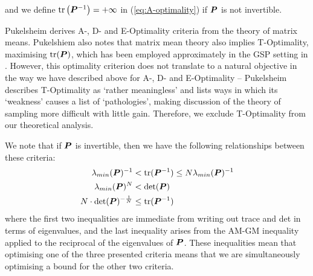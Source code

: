 \noindent and we define $\textrm{tr}\left(\bm{P}^{-1}\right) = +\infty$ in (\ref{eq:A-optimality}) if $\bm{P}$ is not invertible.

Pukelsheim derives A-, D- and E-Optimality criteria from the theory of matrix means. Pukelshiem also notes that matrix mean theory also implies T-Optimality, maximising $\text{tr}(\bm{P})$, which has been employed approximately in the GSP setting in \cite{puy2018random}. However, this optimality criterion does not translate to a natural objective in the way we have described above for A-, D- and E-Optimality -- Pukelsheim describes T-Optimality as `rather meaningless'\cite[Section 6.5]{pukelsheim2006optimal} and lists ways in which its `weakness' causes a list of `pathologies', making discussion of the theory of sampling more difficult with little gain. Therefore, we exclude T-Optimality from our theoretical analysis. 

We note that if $\bm{P}$ is invertible, then we have the following relationships between these criteria:
\begin{align}
    \lambda_{min}(\bm{P})^{-1} &< \text{tr}(\bm{P}^{-1}) \leq N \lambda_{min}(\bm{P})^{-1} \\
    \lambda_{min}(\bm{P})^{N} &< \text{det}(\bm{P}) \\
    N \cdot \text{det}(\bm{P})^{-\frac{1}{N}} &\leq \text{tr}(\bm{P}^{-1})
\end{align}
where the first two inequalities are immediate from writing out trace and det in terms of eigenvalues, and the last inequality arises from the AM-GM inequality applied to the reciprocal of the eigenvalues of $\bm{P}$. These inequalities mean that optimising one of the three presented criteria means that we are simultaneously optimising a bound for the other two criteria.

